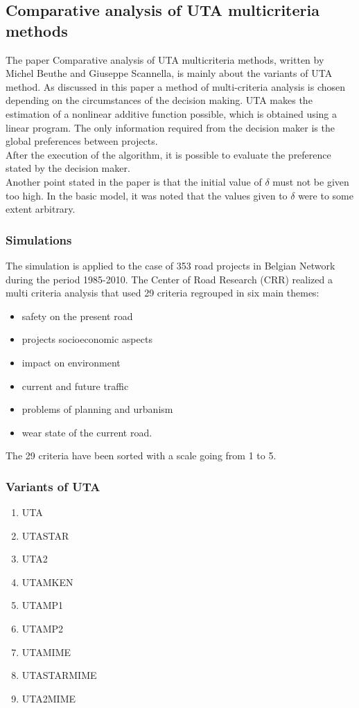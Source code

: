 \documentclass{report}
\begin{document}
\subsection{Comparative analysis of UTA multicriteria methods}
The paper Comparative analysis of UTA multicriteria methods, written by Michel Beuthe and Giuseppe Scannella, is mainly about the variants of UTA method. As discussed in this paper a method of multi-criteria analysis is chosen depending on the circumstances of the decision making. UTA makes the estimation of a nonlinear additive function possible, which is obtained using a linear program. The only information required from the decision maker is the global preferences between projects. \\
After the execution of the algorithm, it is possible to evaluate the preference stated by the decision maker.\\
Another point stated in the paper is that the initial value of $\delta$ must not be given too high. In the basic model, it was noted that the values given to $\delta$ were to some extent arbitrary. 
\subsubsection{Simulations}
The simulation is applied to the case of 353 road projects in Belgian Network during the period 1985-2010. The Center of Road Research (CRR) realized a multi criteria analysis that used 29 criteria regrouped in six main themes: 
\begin{itemize}
\item safety on the present road
\item projects socioeconomic aspects
\item impact on environment
\item current and future traffic
\item problems of planning and urbanism
\item wear state of the current road.
\end{itemize}
The 29 criteria have been sorted with a scale going from 1 to 5. 

\subsubsection{Variants of UTA}
\begin{enumerate}
\item UTA
\item UTASTAR
\item UTA2
\item UTAMKEN
\item UTAMP1
\item UTAMP2
\item UTAMIME
\item UTASTARMIME
\item UTA2MIME
\end{enumerate}
\end{document}
